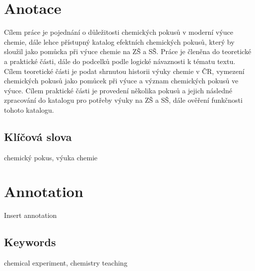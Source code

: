 \documentclass{template/socthesis}
\author{Jan Romanovský}
\begin{document}
	\maketitle



	\pagestyle{empty}

	\section*{Anotace}
	Cílem práce je pojednání o důležitosti chemických pokusů v moderní výuce chemie, dále lehce přístupný katalog efektních chemických pokusů, který by sloužil jako pomůcka při výuce chemie na ZŠ a SŠ. Práce je členěna do teoretické a praktické části, dále do podcelků podle logické návaznosti k tématu textu.
	Cílem teoretické části je podat shrnutou historii výuky chemie v ČR, vymezení chemických pokusů jako pomůcek při výuce a význam chemických pokusů ve výuce.
	Cílem praktické části je provedení několika pokusů a jejich následné zpracování do katalogu pro potřeby výuky na ZŠ a SŠ, dále ověření funkčnosti tohoto katalogu.

	\subsection*{Klíčová slova}
	chemický pokus, výuka chemie

	\vspace{20mm}

	\section*{Annotation}
	Insert annotation

	\subsection*{Keywords}
	chemical experiment, chemistry teaching

	\newpage
	\pagestyle{plain}

    \tableofcontents %

	\setcounter{figure}{0}
	\setcounter{table}{0}
	\newpage

	

	

	

	

	\newpage
	\printbibliography[title=Literatura]



\end{document}
